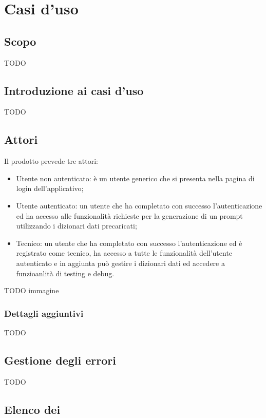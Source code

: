 \section{Casi d'uso}

\subsection{Scopo}
TODO
\subsection{Introduzione ai casi d'uso}
TODO

\subsection{Attori}
Il prodotto prevede tre attori:
\begin{itemize}
  \item Utente non autenticato: è un utente generico che si presenta nella pagina di login dell'applicativo;
  \item Utente autenticato: un utente che ha completato con successo l'autenticazione ed ha accesso alle funzionalità richieste per la generazione di un prompt utilizzando i dizionari dati precaricati;
  \item Tecnico: un utente che ha completato con successo l'autenticazione ed è registrato come tecnico, ha accesso a tutte le funzionalità dell'utente autenticato e in aggiunta può gestire i dizionari dati ed accedere a funzioanlità di testing e debug.
\end{itemize}

TODO immagine
\subsubsection{Dettagli aggiuntivi}
TODO

\subsection{Gestione degli errori}
TODO

\subsection{Elenco dei }

